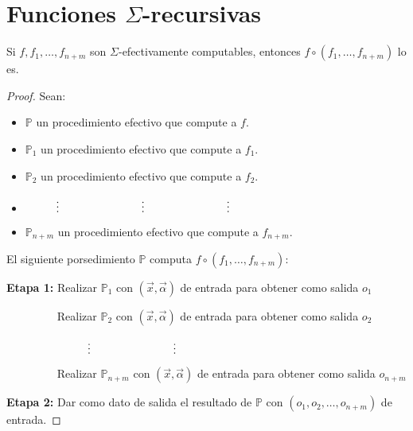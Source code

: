 \section{Funciones $\Sigma$-recursivas}

  \begin{lemma}
    \par Si $f, f_{1}, \dotsc, f_{n+m}$ son $\Sigma$-efectivamente computables, entonces $f \circ (f_{1}, \dotsc,
    f_{n+m})$ lo es.
  \end{lemma}
  \begin{proof}
    Sean:

    \begin{itemize}
      \item $\mathbb{P}$ un procedimiento efectivo que compute a $f$.
      \item $\mathbb{P}_{1}$ un procedimiento efectivo que compute a $f_{1}$.
      \item $\mathbb{P}_{2}$ un procedimiento efectivo que compute a $f_{2}$.
      \item $\vdotswithin{(n-1)m+1} \qquad \vdotswithin{(n-1)m+2} \qquad \vdotswithin{(n-1)m+r}$
      \item $\mathbb{P}_{n+m}$ un procedimiento efectivo que compute a $f_{n+m}$.
    \end{itemize}

    \par El siguiente porsedimiento $\mathbb{P}$ computa $f \circ (f_{1}, \dotsc, f_{n+m})$:

    \vspace{3mm}
    \textbf{Etapa 1:}
    Realizar $\mathbb{P}_{1}$ con $(\vec{x}, \vec{\alpha})$ de entrada para obtener como salida $o_{1}$

    $\qquad\qquad\;\;$Realizar $\mathbb{P}_{2}$ con $(\vec{x}, \vec{\alpha})$ de entrada para obtener como salida $o_{2}$

    $\qquad\qquad\;\;\vdotswithin{(n-1)m+1} \qquad \vdotswithin{(n-1)m+2}$

    $\qquad\qquad\;\;$Realizar $\mathbb{P}_{n+m}$ con $(\vec{x}, \vec{\alpha})$ de entrada para obtener como salida $o_{n+m}$


    \textbf{Etapa 2:}
    Dar como dato de salida el resultado de $\mathbb{P}$ con $(o_{1}, o_{2}, \dotsc, o_{n+m})$ de entrada.
  \end{proof}

